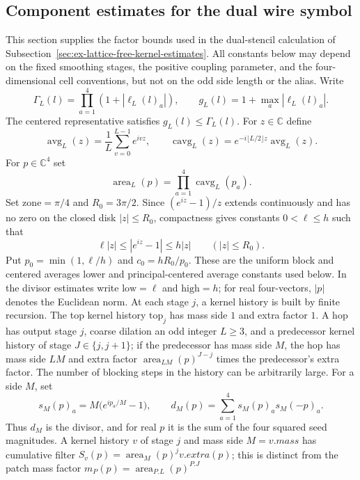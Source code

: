 \subsection{Component estimates for the dual wire symbol}
\label{sec:ex-lattice-free-kernel-components}

This section supplies the factor bounds used in the dual-stencil calculation
of Subsection~\ref{sec:ex-lattice-free-kernel-estimates}. All constants below
may depend on the fixed smoothing stages, the positive coupling parameter,
and the four-dimensional cell conventions, but not on the odd side length
or the alias. Write
\[
 \Gamma_L(l)=\prod_{a=1}^4(1+|\ell_L(l)_a|),\qquad
 g_L(l)=1+\max_a|\ell_L(l)_a|.
\]
The centered representative satisfies $g_L(l)\leq\Gamma_L(l)$. For
$z\in\mathbb C$ define
\[
 \operatorname{avg}_L(z)=\frac1L\sum_{v=0}^{L-1}e^{ivz},\qquad
 \operatorname{cavg}_L(z)=e^{-i\lfloor L/2\rfloor z}
                            \operatorname{avg}_L(z).
\]
For $p\in\mathbb C^4$ set
\[
 \operatorname{area}_L(p)=\prod_{a=1}^4\operatorname{cavg}_L(p_a).
\]
Set $\mathrm{zone}=\pi/4$ and $R_0=3\pi/2$. Since
$(e^{iz}-1)/z$ extends continuously and has no
zero on the closed disk $|z|\leq R_0$, compactness gives constants
$0<\ell\leq h$ such that
\[
 \ell|z|\leq|e^{iz}-1|\leq h|z|\qquad(|z|\leq R_0).
\]
Put $p_0=\min(1,\ell/h)$ and $c_0=hR_0/p_0$. These are the uniform
block and centered averages lower and principal-centered average constants used below.
In the divisor estimates write $\mathrm{low}=\ell$ and $\mathrm{high}=h$;
for real four-vectors, $|p|$ denotes the Euclidean norm.
At each stage $j$, a kernel history is built by finite recursion. The top kernel history
$\mathrm{top}_j$ has mass side $1$ and extra factor $1$. A hop has output
stage $j$, coarse dilation an odd integer $L\geq3$, and a predecessor kernel history
of stage $J\in\{j,j+1\}$; if the predecessor has mass side $M$, the hop has
mass side $LM$ and extra factor
$\operatorname{area}_{LM}(p)^{J-j}$ times the predecessor's extra factor.
The number of blocking steps in the history can be arbitrarily large.
For a side $M$, set
\[
 s_M(p)_a=M\bigl(e^{ip_a/M}-1\bigr),\qquad
 d_M(p)=\sum_{a=1}^4s_M(p)_a s_M(-p)_a.
\]
Thus $d_M$ is the divisor, and for real $p$ it is the sum of the four
squared seed magnitudes. A kernel history $v$ of stage $j$ and mass side $M=v.mass$
has cumulative filter $S_v(p)=\operatorname{area}_{M}(p)^jv.extra(p)$; this is distinct
from the patch mass factor $m_P(p)=\operatorname{area}_{P.L}(p)^{P.J}$
